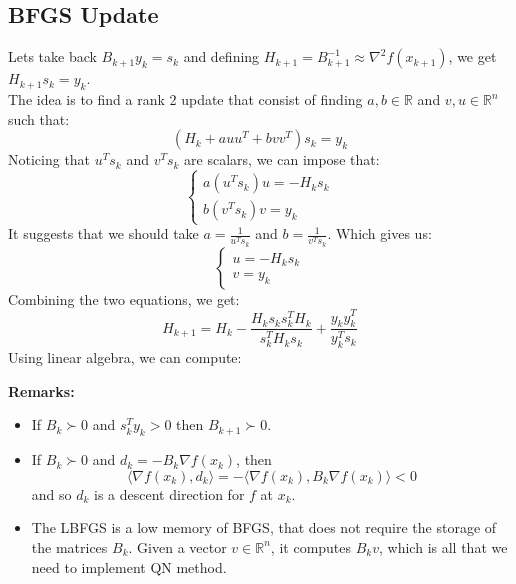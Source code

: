 \documentclass[12pt, openany]{report}
\newcommand{\R}{\mathbb{R}}
\theoremstyle{definition}
\begin{document}
\subsection{BFGS Update}
Lets take back $B_{k+1} y_k = s_k$ and defining $H_{k+1} = B_{k+1}^{-1} \approx \nabla^2 f(x_{k+1})$, we get $H_{k+1} s_k = y_k$.\\
The idea is to find a rank 2 update that consist of finding $a,b \in \R$ and $v,u \in \R^n$ such that:
\begin{equation}\label{eq:rank2_update_idea}
	\left(H_k + a uu^T + b vv^T\right)s_k = y_k
\end{equation}
Noticing that $u^Ts_k$ and $v^Ts_k$ are scalars, we can impose that:
\begin{equation}
	\begin{cases}
		a(u^Ts_k) u = -H_ks_k\\
		b(v^Ts_k) v = y_k
	\end{cases}
\end{equation}
It suggests that we should take $a= \frac{1}{u^Ts_k}$ and $b = \frac{1}{v^Ts_k}$. Which gives us:
\begin{equation}
	\begin{cases}
		u = -H_ks_k\\
		v = y_k
	\end{cases}
\end{equation}
Combining the two equations, we get:
\begin{equation}
	H_{k+1} = H_k - \frac{H_ks_ks_k^TH_k}{s_k^TH_ks_k} + \frac{y_ky_k^T}{y_k^Ts_k}
\end{equation}
Using linear algebra, we can compute:\\
\begin{center}
	\color{red}
	\color{black}
\end{center}
\textbf{Remarks:}
\begin{itemize}
	\item If $B_k \succ 0$ and $s_k^Ty_k > 0$ then $B_{k+1} \succ 0$.
	\item If $B_k \succ 0$ and $d_k = - B_k \nabla f(x_k)$, then 
	\begin{equation}
		\langle \nabla f(x_k), d_k \rangle = - \langle \nabla f(x_k), B_k \nabla f(x_k) \rangle < 0
	\end{equation}
	and so $d_k$ is a descent direction for $f$ at $x_k$.
	\item The LBFGS is a low memory of BFGS, that does not require the storage of the matrices $B_k$. Given a vector $v \in \R^n$, it computes $B_kv$, which is all that we need to implement QN method.
\end{itemize}
\end{document}
